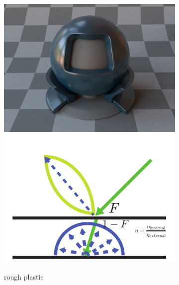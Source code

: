 \documentclass{article}
\begin{document}
\begin{figure}
    \begin{subfigure}[t]{0.32\linewidth}
        \centering
        \begin{minipage}[t]{\linewidth}
            \includegraphics[width=\linewidth]{imgs/roughplastic_render.png}
            \includegraphics[width=\linewidth]{imgs/roughplastic.pdf}
        \end{minipage}
        \caption{rough plastic}
        \label{fig:rough_plastic}
    \end{subfigure}
    \begin{subfigure}[t]{0.32\linewidth}
        \centering
        \begin{minipage}[t]{\linewidth}

\end{minipage}
\end{subfigure}
\end{figure}
\end{document}
